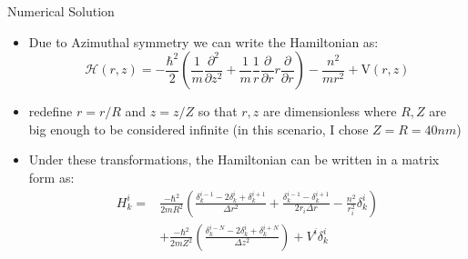 \documentclass{beamer}
\begin{document}
\begin{frame}{Numerical Solution}
    \begin{itemize}
        \item Due to Azimuthal symmetry we can write the Hamiltonian as:
        \begin{equation}
            \mathcal{H}(r, z) = -\frac{\hbar^2}{2}\left( \frac{1}{m}\frac{\partial^2}{\partial z^2} + \frac{1}{m}\frac{1}{r}\frac{\partial}{\partial r} r \frac{\partial}{\partial r}\right) - \frac{n^2}{m r^2} + \mathrm{V}(r, z) 
            \label{Hamiltonian}
        \end{equation}

        \item redefine $r = r/R$ and $z = z/Z$ so that $r, z$ are dimensionless where $R, Z$ are big enough to be considered infinite (in this scenario, I chose $Z = R = 40nm$)

        \item Under these transformations, the Hamiltonian can be written in a matrix form as:
        \begin{equation}
            \begin{split}
            H^i_k = & \frac{-\hbar^2}{2mR^2}\left( \frac{ \delta^{i-1}_k -2 \delta^{i}_k + \delta^{i+1}_k} {\Delta r^2} + \frac{\delta^{i-1}_k - \delta^{i+1}_k}{2r_i\Delta r} - \frac{n^2}{r_i^2}\delta^{i}_k\right) \\
            & + \frac{-\hbar^2}{2mZ^2}\left(\frac{\delta^{i-N}_k -2\delta^{i}_k + \delta^{i+N}_k}{\Delta z^2}\right) + V^i \delta^i_k
            \end{split}
            \label{H matrix}
        \end{equation}
    \end{itemize}
\end{frame}
\end{document}
